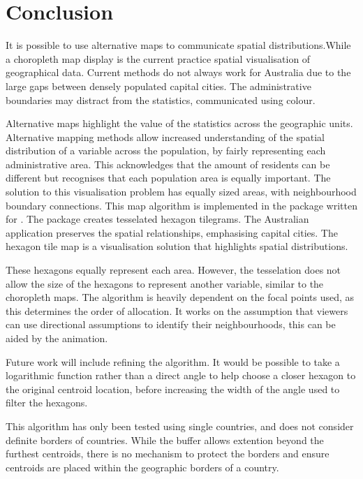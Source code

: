 \documentclass[
]{jss}
\begin{document}
\hypertarget{conclusion}{%
\section{Conclusion}\label{conclusion}}

It is possible to use alternative maps to communicate spatial
distributions.While a choropleth map display is the current practice
spatial visualisation of geographical data. Current methods do not
always work for Australia due to the large gaps between densely
populated capital cities. The administrative boundaries may distract
from the statistics, communicated using colour.

Alternative maps highlight the value of the statistics across the
geographic units. Alternative mapping methods allow increased
understanding of the spatial distribution of a variable across the
population, by fairly representing each administrative area. This
acknowledges that the amount of residents can be different but
recognises that each population area is equally important. The solution
to this visualisation problem has equally sized areas, with
neighbourhood boundary connections. This map algorithm is implemented in
the  \citet{sugarbag} package written for 
\citet{R}. The  package creates tesselated hexagon
tilegrams. The Australian application preserves the spatial
relationships, emphasising capital cities. The hexagon tile map is a
visualisation solution that highlights spatial distributions.

These hexagons equally represent each area. However, the tesselation
does not allow the size of the hexagons to represent another variable,
similar to the choropleth maps. The algorithm is heavily dependent on
the focal points used, as this determines the order of allocation. It
works on the assumption that viewers can use directional assumptions to
identify their neighbourhoods, this can be aided by the animation.

Future work will include refining the algorithm. It would be possible to
take a logarithmic function rather than a direct angle to help choose a
closer hexagon to the original centroid location, before increasing the
width of the angle used to filter the hexagons.

This algorithm has only been tested using single countries, and does not
consider definite borders of countries. While the buffer allows
extention beyond the furthest centroids, there is no mechanism to
protect the borders and ensure centroids are placed within the
geographic borders of a country.
\end{document}

